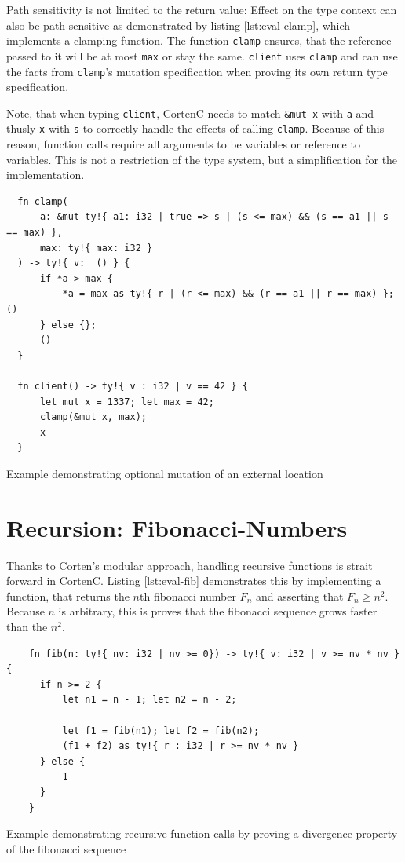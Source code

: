 \documentclass{book}
\newcommand{\code}[1]{\texttt{#1}}
\theoremstyle{definition}
\begin{document}
Path sensitivity is not limited to the return value: Effect on the type context can also be path sensitive as demonstrated by listing \ref{lst:eval-clamp}, which implements a clamping function. The function \code{clamp} ensures, that the reference passed to it will be at most \code{max} or stay the same. \code{client} uses \code{clamp} and can use the facts from \code{clamp}'s mutation specification when proving its own return type specification.

Note, that when typing \code{client}, CortenC needs to match \code{\&mut x} with \code{a} and thusly \code{x} with \code{s} to correctly handle the effects of calling \code{clamp}. Because of this reason, function calls require all arguments to be variables or reference to variables. This is not a restriction of the type system, but a simplification for the implementation.

\begin{listing}[h]
  \begin{verbatim}
  fn clamp(
      a: &mut ty!{ a1: i32 | true => s | (s <= max) && (s == a1 || s == max) }, 
      max: ty!{ max: i32 }
  ) -> ty!{ v:  () } {
      if *a > max {
          *a = max as ty!{ r | (r <= max) && (r == a1 || r == max) }; ()
      } else {};
      ()
  }

  fn client() -> ty!{ v : i32 | v == 42 } {
      let mut x = 1337; let max = 42;
      clamp(&mut x, max);
      x
  }
  \end{verbatim}
  \caption{Example demonstrating optional mutation of an external location}
  \label{lst:eval-clamp}
\end{listing}

\section{Recursion: Fibonacci-Numbers}

Thanks to Corten's modular approach, handling recursive functions is strait forward in CortenC. Listing \ref{lst:eval-fib} demonstrates this by implementing a function, that returns the $n$th fibonacci number $F_n$ and asserting that $F_n \geq n^2$. Because $n$ is arbitrary, this is proves that the fibonacci sequence grows faster than the $n^2$.


\begin{listing}[h]
  \begin{verbatim}
    fn fib(n: ty!{ nv: i32 | nv >= 0}) -> ty!{ v: i32 | v >= nv * nv } {
      if n >= 2 {
          let n1 = n - 1; let n2 = n - 2;

          let f1 = fib(n1); let f2 = fib(n2);
          (f1 + f2) as ty!{ r : i32 | r >= nv * nv }
      } else {
          1
      }
    }
  \end{verbatim}
  \caption{Example demonstrating recursive function calls by proving a divergence property of the fibonacci sequence}
  \label{lst:eval-fib}
\end{listing}
\end{document}
